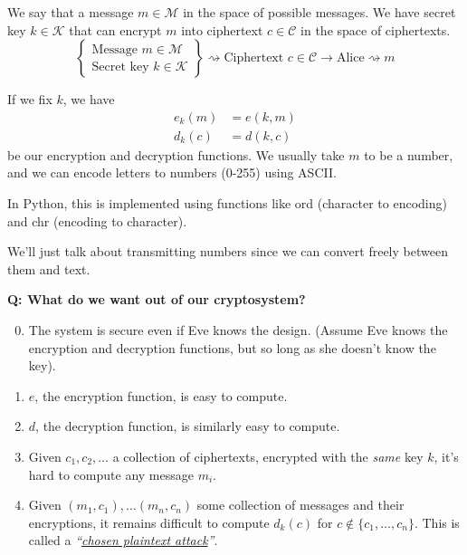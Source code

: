 We say that a message $m\in \mathcal{M}$ in the space of possible messages. We have secret key $k\in \mathcal{K}$ that can encrypt $m$ into ciphertext $c\in \mathcal{C}$ in the space of ciphertexts.
\[\left\{\begin{array}{c}
        \text{Message $m\in \mathcal{M}$} \\
        \text{Secret key $k\in\mathcal{K}$}
    \end{array}\right\} \rightsquigarrow \text{Ciphertext $c\in\mathcal{C}$} \longrightarrow \text{Alice} \rightsquigarrow m\]

If we fix $k$, we have
\begin{align*}
    e_k(m) & = e(k, m) \\
    d_k(c) & = d(k, c)
\end{align*}
be our encryption and decryption functions. We usually take $m$ to be a number, and we can encode letters to numbers (0-255) using ASCII.

In Python, this is implemented using functions like \textsf{ord} (character to encoding) and \textsf{chr} (encoding to character).

We'll just talk about transmitting numbers since we can convert freely between them and text.

\textbf{Q: What do we want out of our cryptosystem?}
\begin{enumerate}
    \setcounter{enumi}{-1}
    \item The system is secure even if Eve knows the design. (Assume Eve knows the encryption and decryption functions, but so long as she doesn't know the key).
    \item $e$, the encryption function, is easy to compute.
    \item $d$, the decryption function, is similarly easy to compute.
    \item Given $c_1, c_2, \dots$ a collection of ciphertexts, encrypted with the \emph{same} key $k$, it's hard to compute any message $m_i$.
    \item Given $(m_1, c_1), \dots (m_n, c_n)$ some collection of messages and their encryptions, it remains difficult to compute $d_k(c)$ for $c\not\in \{c_1, \dots, c_n\}$. This is called a \textit{``\ul{chosen plaintext attack}''}. 
\end{enumerate}